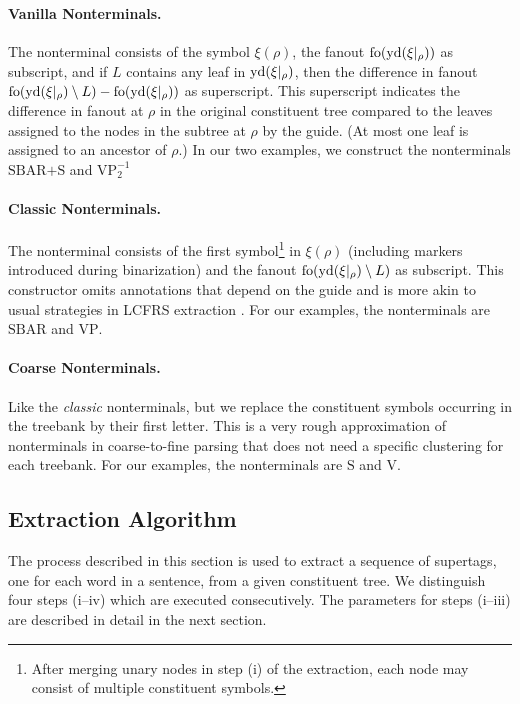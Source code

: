 \documentclass[../../document.tex]{subfiles}
\begin{document}
    \paragraph{Vanilla Nonterminals.}
    The nonterminal consists of the symbol \(\xi(\rho)\), the fanout \(\operatorname{fo}(\operatorname{yd}(\xi|_\rho))\) as subscript, and if \(L\) contains any leaf in \(\operatorname{yd}(\xi|_\rho)\), then the difference in fanout \(\operatorname{fo}(\operatorname{yd}(\xi|_\rho) \setminus L) - \operatorname{fo}(\operatorname{yd}(\xi|_\rho))\) as superscript.
    This superscript indicates the difference in fanout at \(\rho\) in the original constituent tree compared to the leaves assigned to the nodes in the subtree at \(\rho\) by the guide.
    (At most one leaf is assigned to an ancestor of \(\rho\).)
    In our two examples, we construct the nonterminals \(\text{SBAR+S}\) and \(\text{VP}_2^{-1}\)

    \paragraph{Classic Nonterminals.}
    The nonterminal consists of the first symbol\footnote{
        After merging unary nodes in step (i) of the extraction, each node may consist of multiple constituent symbols.}
    in \(\xi(\rho)\) (including markers introduced during binarization) and the fanout \(\operatorname{fo}(\operatorname{yd}(\xi|_\rho) \setminus L)\) as subscript.
    This constructor omits annotations that depend on the guide and is more akin to usual strategies in LCFRS extraction \cite{MaierSogaard08}.
    For our examples, the nonterminals are \(\text{SBAR}\) and \(\text{VP}\).

    \paragraph{Coarse Nonterminals.} Like the \emph{classic} nonterminals, but we replace the constituent symbols occurring in the treebank by their first letter.
    This is a very rough approximation of nonterminals in coarse-to-fine parsing \cite{Cha06} that does not need a specific clustering for each treebank.
    For our examples, the nonterminals are \(\text{S}\) and \(\text{V}\).

    \subsection{Extraction Algorithm}
    The process described in this section is used to extract a sequence of supertags, one for each word in a sentence, from a given constituent tree.
    We distinguish four steps (i--iv) which are executed consecutively.
    The parameters for steps (i--iii) are described in detail in the next section.
\end{document}
